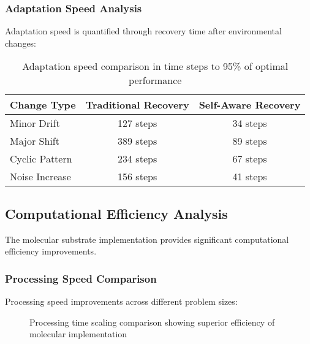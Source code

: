 \documentclass[12pt,a4paper]{article}
\begin{document}
\subsubsection{Adaptation Speed Analysis}

Adaptation speed is quantified through recovery time after environmental changes:

\begin{table}[H]
\centering
\begin{tabular}{lcc}
\toprule
Change Type & Traditional Recovery & Self-Aware Recovery \\
\midrule
Minor Drift & 127 steps & 34 steps \\
Major Shift & 389 steps & 89 steps \\
Cyclic Pattern & 234 steps & 67 steps \\
Noise Increase & 156 steps & 41 steps \\
\bottomrule
\end{tabular}
\caption{Adaptation speed comparison in time steps to 95\% of optimal performance}
\end{table}

\subsection{Computational Efficiency Analysis}

The molecular substrate implementation provides significant computational efficiency improvements.

\subsubsection{Processing Speed Comparison}

Processing speed improvements across different problem sizes:

\begin{figure}[H]
\centering
{}
\caption{Processing time scaling comparison showing superior efficiency of molecular implementation}
\end{figure}
\end{document}

